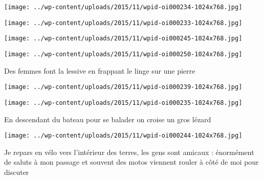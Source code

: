  

 

\begin{center} \texttt{[image: ../wp-content/uploads/2015/11/wpid-oi000234-1024x768.jpg]} \end{center}

 

 

\begin{center} \texttt{[image: ../wp-content/uploads/2015/11/wpid-oi000233-1024x768.jpg]} \end{center}

 

 

\begin{center} \texttt{[image: ../wp-content/uploads/2015/11/wpid-oi000245-1024x768.jpg]} \end{center}

 

 

\begin{center} \texttt{[image: ../wp-content/uploads/2015/11/wpid-oi000250-1024x768.jpg]} \end{center}

 

 Des femmes font la lessive en frappant le linge sur une pierre 

 

\begin{center} \texttt{[image: ../wp-content/uploads/2015/11/wpid-oi000239-1024x768.jpg]} \end{center}

 

 

\begin{center} \texttt{[image: ../wp-content/uploads/2015/11/wpid-oi000235-1024x768.jpg]} \end{center}

 

 En descendant du bateau pour se balader on croise un gros lézard 

 

\begin{center} \texttt{[image: ../wp-content/uploads/2015/11/wpid-oi000244-1024x768.jpg]} \end{center}

 

 Je repars en vélo vers l'intérieur des terres, les gens sont amicaux : énormément de saluts à mon passage et souvent des motos viennent rouler à côté de moi pour discuter 


